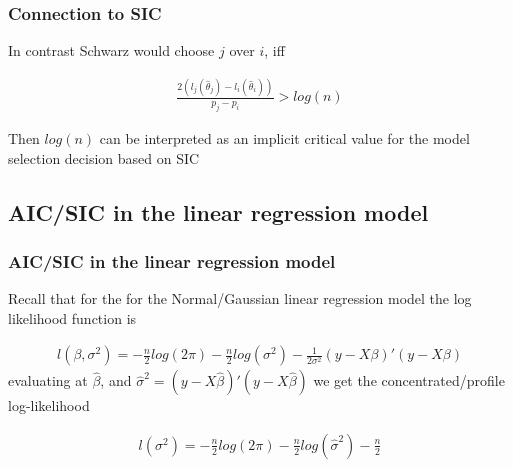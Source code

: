 \documentclass[
  shownotes,
  xcolor={svgnames},
  hyperref={colorlinks,citecolor=DarkBlue,linkcolor=DarkRed,urlcolor=DarkBlue}
  , aspectratio=169]{beamer}
\begin{document}
\begin{frame}[fragile]
\frametitle{Connection to SIC}

  In contrast Schwarz would choose $j$ over $i$, iff 

 \begin{align}
 \frac{2(l_j(\hat \theta_j)-l_i(\hat \theta_i))}{p_j-p_i} > log(n)
 \end{align}

Then $log(n)$ can be interpreted as an implicit critical value for the model selection decision based on SIC

 \end{frame}

\subsection{AIC/SIC in the linear regression model}
\begin{frame}[fragile]
\frametitle{AIC/SIC in the linear regression model}
Recall that for the for the Normal/Gaussian linear regression model the log likelihood function is

\begin{align}
l(\beta,\sigma^2) = -\frac{n}{2}log(2\pi)-\frac{n}{2}log(\sigma^2) -\frac{1}{2\sigma^2} (y-X\beta)'(y-X\beta)
\end{align}
evaluating at $\hat \beta$, and $\hat{\sigma}^2=(y-X\hat\beta)'(y-X\hat\beta)$ we get the concentrated/profile log-likelihood

\begin{align}
l(\sigma^2) = -\frac{n}{2}log(2\pi)-\frac{n}{2}log(\hat \sigma^2) -\frac{n}{2}
\end{align}


 \end{frame}
\end{document}
